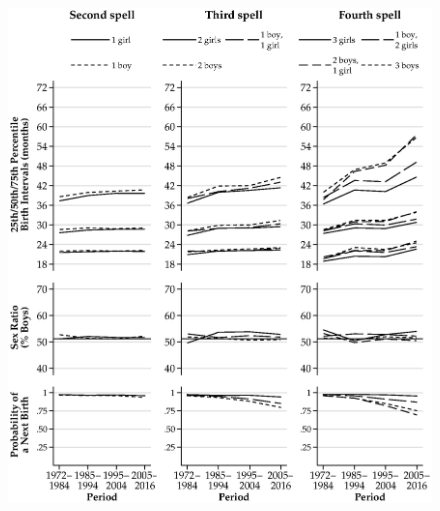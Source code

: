 \documentclass[12pt,letterpaper]{article}
\begin{document}
\captionsetup[figure]{skip = -16pt}

\begin{figure}
\centering
\includegraphics[width=\textwidth,height=\textheight,keepaspectratio=true]{bs_low_rural}
\end{figure}
\end{document}
